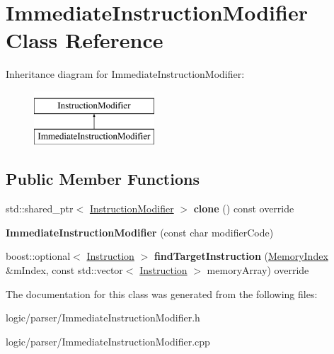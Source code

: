 \hypertarget{classImmediateInstructionModifier}{}\section{Immediate\+Instruction\+Modifier Class Reference}
\label{classImmediateInstructionModifier}
Inheritance diagram for Immediate\+Instruction\+Modifier\+:\begin{figure}[H]
\begin{center}
\leavevmode
\includegraphics[height=2.000000cm]{classImmediateInstructionModifier}
\end{center}
\end{figure}
\subsection*{Public Member Functions}
\begin{DoxyCompactItemize}
\item 
\mbox{\label{classImmediateInstructionModifier_aa7e056831824684e06dfa6b1c573272a}} 
std\+::shared\+\_\+ptr$<$ \hyperlink{classInstructionModifier}{Instruction\+Modifier} $>$ {\bfseries clone} () const override
\item 
\mbox{\label{classImmediateInstructionModifier_a5fd1e82bd9300c68f0f4afe196602185}} 
{\bfseries Immediate\+Instruction\+Modifier} (const char modifier\+Code)
\item 
\mbox{\label{classImmediateInstructionModifier_a7d9f20931dad071a78c925df789c4972}} 
boost\+::optional$<$ \hyperlink{classInstruction}{Instruction} $>$ {\bfseries find\+Target\+Instruction} (\hyperlink{classMemoryIndex}{Memory\+Index} \&m\+Index, const std\+::vector$<$ \hyperlink{classInstruction}{Instruction} $>$ memory\+Array) override
\end{DoxyCompactItemize}


The documentation for this class was generated from the following files\+:\begin{DoxyCompactItemize}
\item 
logic/parser/Immediate\+Instruction\+Modifier.\+h\item 
logic/parser/Immediate\+Instruction\+Modifier.\+cpp\end{DoxyCompactItemize}
